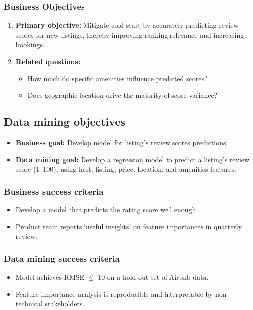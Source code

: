 \subsubsection{Business Objectives}\label{sec:businessObjectives}
\begin{enumerate}
  \item \textbf{Primary objective:} Mitigate cold start by accurately predicting review scores for new listings, thereby improving ranking relevance and increasing bookings.
  \item \textbf{Related questions:}
        \begin{itemize}
          \item How much do specific amenities influence predicted scores?
          \item Does geographic location drive the majority of score variance?
        \end{itemize}
\end{enumerate}

\subsection{Data mining objectives}\label{sec:dataMiningObjectives}
\begin{itemize}
  \item \textbf{Business goal:} Develop model for listing's review scores predictions.
  \item \textbf{Data mining goal:} Develop a regression model to predict a listing's review score (1--100), using host, listing, price, location, and amenities features.
\end{itemize}

\subsubsection{Business success criteria}\label{sec:businessSuccessCriteria}
\begin{itemize}
  \item Develop a model that predicts the rating score well enough.
  \item Product team reports `useful insights' on feature importances in quarterly review.
\end{itemize}

\subsubsection{Data mining success criteria}\label{sec:dataMiningSuccessCriteria}
\begin{itemize}
  \item Model achieves RMSE $\leq$ 10 on a hold-out set of Airbnb data.
  \item Feature importance analysis is reproducible and interpretable by non-technical stakeholders.
\end{itemize}

